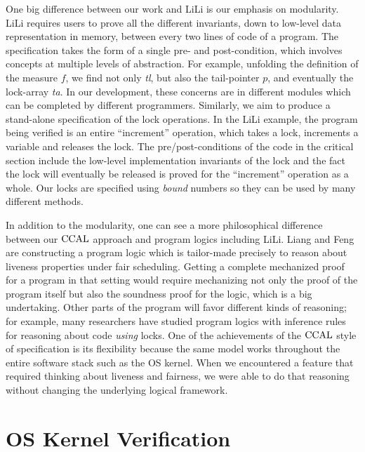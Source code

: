 One big difference between our work and LiLi is our emphasis on
modularity.  
LiLi requires users to prove all the different invariants, down to low-level data representation in memory, between every two lines of code of a program.
The specification takes the form of a single
pre- and post-condition, which involves concepts at multiple levels of
abstraction. For example, unfolding the definition of the measure $f$,
we find not only \textit{tl}, but also the tail-pointer $p$, and
eventually the lock-array  \textit{ta}. In our development, these
concerns are in different modules which can be completed by different
programmers.  Similarly, we aim to produce a stand-alone specification
of the lock operations. In the LiLi example, the program being
verified is an entire ``increment'' operation, which takes a lock,
increments a variable and releases the lock. The pre/post-conditions
of the code in the critical section include the low-level
implementation invariants of the lock and the fact the lock will
eventually be released is proved for the ``increment'' operation as a
whole. Our locks are specified using \emph{bound} numbers so  they can be used by many different methods.

In addition to the modularity, one can see a more philosophical difference
between our $\mathrm{CCAL}$ approach and program logics including LiLi.  
Liang and Feng are constructing a program logic which is tailor-made
precisely to reason about liveness properties under fair
scheduling. 
Getting a complete mechanized proof for a program in that
setting would require mechanizing not only the proof of the program
itself but also the soundness proof for the logic, which is a big
undertaking. 
Other parts of the program will favor different kinds of
reasoning; for example, many researchers have studied program logics
with inference rules for reasoning about code \emph{using} locks. One
of the achievements of the $\mathrm{CCAL}$ style of specification is its flexibility because the same model works throughout the entire software stack such as the OS kernel. When
we encountered a feature that required thinking about liveness and
fairness, we were able to do that reasoning without changing the
underlying logical framework.


\section{OS Kernel Verification} 
\label{chatper:related:sec:os-kernel-verification}

